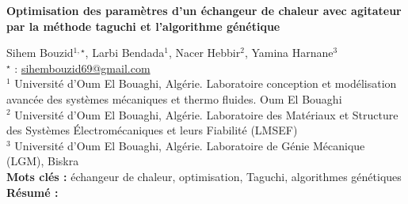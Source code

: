 


    \newpage


%
\begin{flushleft}
\addtocounter{section}{1}
{\Large \textbf{Optimisation des paramètres d'un échangeur de chaleur avec agitateur par la méthode taguchi et l'algorithme génétique}}\label{ref:21}
\end{flushleft}
%
Sihem Bouzid$^{1,\star}$, Larbi Bendada$^{1}$, Nacer Hebbir$^{2}$, Yamina Harnane$^{3}$\\[2mm]
$^{\star}$ \Letter : \url{sihembouzid69@gmail.com}\\[2mm]
{\footnotesize $^{1}$ Université d'Oum El Bouaghi, Algérie. Laboratoire conception et modélisation avancée des systèmes mécaniques et thermo fluides. Oum El Bouaghi}\\
{\footnotesize $^{2}$ Université d'Oum El Bouaghi, Algérie. Laboratoire des Matériaux et Structure des Systèmes Électromécaniques et leurs Fiabilité (LMSEF)}\\
{\footnotesize $^{3}$ Université d'Oum El Bouaghi, Algérie. Laboratoire de Génie Mécanique (LGM), Biskra }\\
[4mm]
%
\noindent \textbf{Mots clés : } échangeur de chaleur, optimisation, Taguchi, algorithmes génétiques\\[4mm]
%
\noindent \textbf{Résumé : } 

